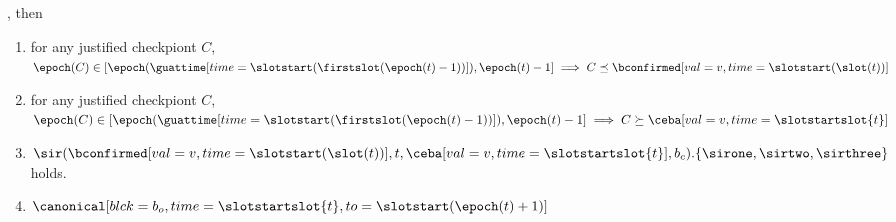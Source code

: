 \documentclass{article}
\begin{document}
\begin{lemma}
\begin{enumerate}
    \end{enumerate},
    then
    \begin{enumerate}
        \item for any justified checkpiont $C$, $\epoch(C) \in [\epoch(\guattime[time=\slotstart(\firstslot(\epoch(t)-1))]),\epoch(t)-1] \implies C  \preceq \bconfirmed[val=v,time=\slotstart(\slot(t))]$
        \item for any justified checkpiont $C$, $\epoch(C) \in [\epoch(\guattime[time=\slotstart(\firstslot(\epoch(t)-1))]),\epoch(t)-1] \implies C  \succeq \ceba[val=v,time=\slotstartslot{t}]$
        \item $\sir(\bconfirmed[val=v,time=\slotstart(\slot(t))],t,\ceba[val=v,time=\slotstartslot{t}],b_c).\{ \sirone, \sirtwo, \sirthree\}$ holds.
        \item $\canonical[blck=b_o,time={\slotstartslot{t}},to=\slotstart(\epoch(t)+1)]$
    \end{enumerate}
\end{lemma}
\end{document}

